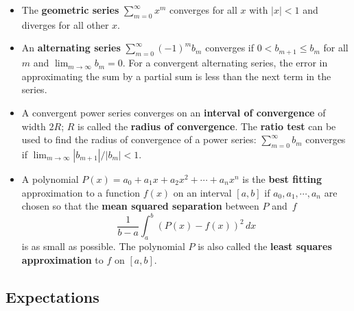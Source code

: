 \begin{itemize}
\item The {\bf geometric series} $\sum_{m = 0}^{\infty} x^m$ converges
  for all $x$ with $|x| < 1$ and diverges for all other $x$.

\item An {\bf alternating series} $\sum_{m=0}^{\infty} (-1)^mb_m$
  converges if $0 < b_{m+1} \leq b_m$ for all $m$ and $\lim_{m \to
    \infty} b_m = 0$.  For a convergent alternating series, the error
  in approximating the sum by a partial sum is less than the next term
  in the series.

\item A convergent power series converges on an {\bf interval of
  convergence} of width $2R$; $R$ is called the {\bf radius of
  convergence}.  The {\bf ratio test} can be used to find the radius
  of convergence of a power series: $\sum_{m=0}^{\infty} b_m$
  converges if $\lim_{m \to \infty} |b_{m+1}|/|b_m| < 1$.

\item A polynomial $P(x)=a_0+a_1 x+a_2 x^2 + \cdots + a_n x^n$ is the
  {\bf best fitting} approximation to a function $f(x)$ on an interval
  $[a,b]$ if $a_0, a_1, \cdots, a_n$ are chosen so that the {\bf mean
    squared separation} between $P$ and~$f$
\[
\frac{1}{b-a} \int_a^b (P(x)-f(x))^2 \, dx
\]
is as small as possible. The polynomial $P$ is also called the {\bf
  least squares approximation} to $f$ on $[a,b]$.


\end{itemize}


\subsection{Expectations}
\label{subsec:expectations}

